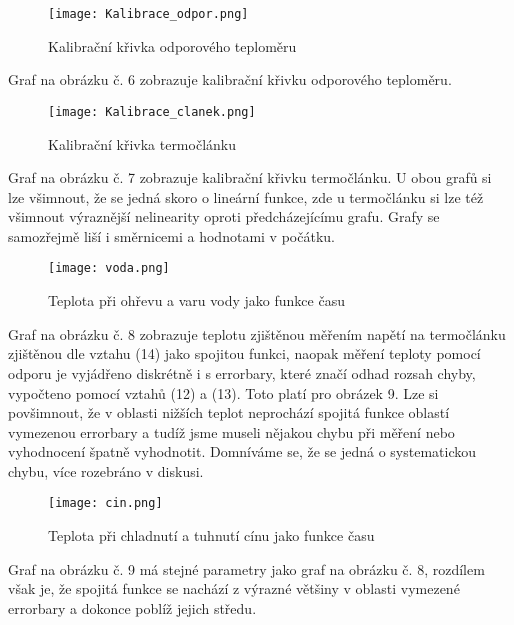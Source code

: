 \documentclass{article}
\begin{document}
\begin{figure}[H]
\centering
\caption{Kalibrační křivka odporového teploměru}
\texttt{[image: Kalibrace\_odpor.png]}
\end{figure}
\par Graf na obrázku č. 6 zobrazuje kalibrační křivku odporového teploměru.

\begin{figure}[H]
\centering
\caption{Kalibrační křivka termočlánku}
\texttt{[image: Kalibrace\_clanek.png]}
\end{figure}
\par Graf na obrázku č. 7 zobrazuje kalibrační křivku termočlánku. U obou grafů si lze všimnout, že se jedná skoro o lineární funkce, zde u termočlánku si lze též všimnout výraznější nelinearity oproti předcházejícímu grafu. Grafy se samozřejmě liší i směrnicemi a hodnotami v počátku.

\begin{figure}[H]
\centering
\caption{Teplota při ohřevu a varu vody jako funkce času}
\texttt{[image: voda.png]}
\end{figure}
\par Graf na obrázku č. 8 zobrazuje teplotu zjištěnou měřením napětí na termočlánku zjištěnou dle vztahu (14) jako spojitou funkci, naopak měření teploty pomocí odporu je vyjádřeno diskrétně i s errorbary, které značí odhad rozsah chyby, vypočteno pomocí vztahů (12) a (13). Toto platí pro obrázek 9. Lze si povšimnout, že v oblasti nižších teplot neprochází spojitá funkce oblastí vymezenou errorbary a tudíž jsme museli nějakou chybu při měření nebo vyhodnocení špatně vyhodnotit. Domníváme se, že se jedná o systematickou chybu, více rozebráno v diskusi.

\begin{figure}[H]
\centering
\caption{Teplota při chladnutí a tuhnutí cínu jako funkce času}
\texttt{[image: cin.png]}
\end{figure}
\par Graf na obrázku č. 9 má stejné parametry jako graf na obrázku č. 8, rozdílem však je, že spojitá funkce se nachází z výrazné většiny v oblasti vymezené errorbary a dokonce poblíž jejich středu. 
\end{document}
